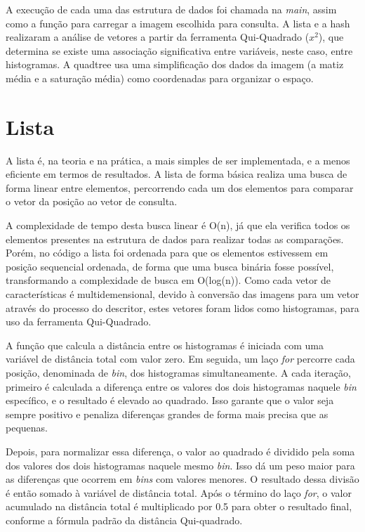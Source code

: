 \documentclass{sbc2023}%
\begin{document}
A execução de cada uma das estrutura de dados foi chamada na \textit{main}, assim como a função para carregar a imagem escolhida para consulta. A lista e a hash realizaram a análise de vetores a partir da ferramenta Qui-Quadrado ($x^2$), que determina se existe uma associação significativa entre variáveis, neste caso, entre histogramas. A quadtree usa uma simplificação dos dados da imagem (a matiz média e a saturação média) como coordenadas para organizar o espaço.

\section{Lista}
A lista é, na teoria e na prática, a mais simples de ser implementada, e a menos eficiente em termos de resultados. A lista de forma básica realiza uma busca de forma linear entre elementos, percorrendo cada um dos elementos para comparar o vetor da posição ao vetor de consulta.

A complexidade de tempo desta busca linear é O(n), já que ela verifica todos os elementos presentes na estrutura de dados para realizar todas as comparações. Porém, no código a lista foi ordenada para que os elementos estivessem em posição sequencial ordenada, de forma que uma busca binária fosse possível, transformando a complexidade de busca em O(log(n)). Como cada vetor de características é multidemensional, devido à conversão das imagens para um vetor através do processo do descritor, estes vetores foram lidos como histogramas, para uso da ferramenta Qui-Quadrado.

A função que calcula a distância entre os histogramas é iniciada com uma variável de distância total com valor zero. Em seguida, um laço \textit{for} percorre cada posição, denominada de \textit{bin}, dos histogramas simultaneamente. A cada iteração, primeiro é calculada a diferença entre os valores dos dois histogramas naquele \textit{bin} específico, e o resultado é elevado ao quadrado. Isso garante que o valor seja sempre positivo e penaliza diferenças grandes de forma mais precisa que as pequenas.

Depois, para normalizar essa diferença, o valor ao quadrado é dividido pela soma dos valores dos dois histogramas naquele mesmo \textit{bin}. Isso dá um peso maior para as diferenças que ocorrem em \textit{bins} com valores menores. O resultado dessa divisão é então somado à variável de distância total. Após o término do laço \textit{for}, o valor acumulado na distância total é multiplicado por 0.5 para obter o resultado final, conforme a fórmula padrão da distância Qui-quadrado.
\end{document}
